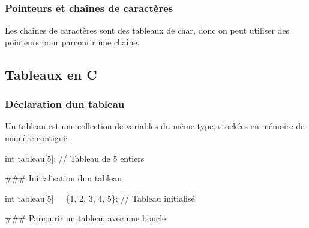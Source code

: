 \subsubsection*{Pointeurs et chaînes de caractères}


\begin{DoxyItemize}
\item Les chaînes de caractères sont des tableaux de {\ttfamily char}, donc on peut utiliser des pointeurs pour parcourir une chaîne.
\end{DoxyItemize}




\subsection*{Tableaux en C}

\subsubsection*{Déclaration d\textquotesingle{}un tableau}


\begin{DoxyItemize}
\item Un tableau est une collection de variables du même type, stockées en mémoire de manière contiguë.
\end{DoxyItemize}


\begin{DoxyCode}
\textcolor{keywordtype}{int} tableau[5];  \textcolor{comment}{// Tableau de 5 entiers}
\end{DoxyCode}


\#\#\# Initialisation d\textquotesingle{}un tableau 
\begin{DoxyCode}
\textcolor{keywordtype}{int} tableau[5] = \{1, 2, 3, 4, 5\};  \textcolor{comment}{// Tableau initialisé}
\end{DoxyCode}


\#\#\# Parcourir un tableau avec une boucle 


